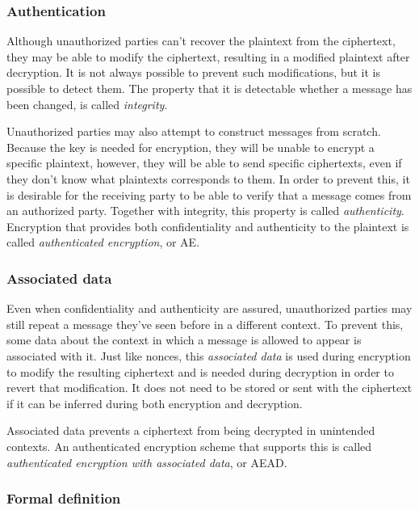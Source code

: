 \subsubsection{Authentication}

Although unauthorized parties can't recover the plaintext from the ciphertext,
they may be able to modify the ciphertext, resulting in a modified plaintext
after decryption. It is not always possible to prevent such modifications, but
it is possible to detect them. The property that it is detectable whether a
message has been changed, is called \emph{integrity}.

Unauthorized parties may also attempt to construct messages from scratch.
Because the key is needed for encryption, they will be unable to encrypt a
specific plaintext, however, they will be able to send specific ciphertexts,
even if they don't know what plaintexts corresponds to them. In order to prevent
this, it is desirable for the receiving party to be able to verify that a
message comes from an authorized party. Together with integrity, this property
is called \emph{authenticity}. Encryption that provides both confidentiality and
authenticity to the plaintext is called \emph{authenticated encryption}, or AE.

\subsubsection{Associated data}

Even when confidentiality and authenticity are assured, unauthorized parties may
still repeat a message they've seen before in a different context. To prevent
this, some data about the context in which a message is allowed to appear is
associated with it. Just like nonces, this \emph{associated data} is used during
encryption to modify the resulting ciphertext and is needed during decryption in
order to revert that modification. It does not need to be stored or sent with the
ciphertext if it can be inferred during both encryption and decryption.

Associated data prevents a ciphertext from being decrypted in unintended
contexts. An authenticated encryption scheme that supports this is called
\emph{authenticated encryption with associated data}, or AEAD.

\subsubsection{Formal definition}

